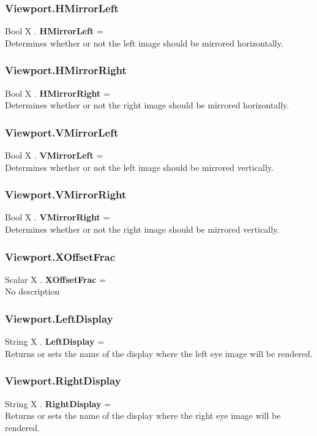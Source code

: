 \subsubsection{Viewport.HMirrorLeft \label{F:Viewport:HMirrorLeft}}
Bool X . \textbf{HMirrorLeft} = \\
Determines whether or not the left image should be mirrored horizontally.


\subsubsection{Viewport.HMirrorRight \label{F:Viewport:HMirrorRight}}
Bool X . \textbf{HMirrorRight} = \\
Determines whether or not the right image should be mirrored horizontally.

\subsubsection{Viewport.VMirrorLeft \label{F:Viewport:VMirrorLeft}}
Bool X . \textbf{VMirrorLeft} = \\
Determines whether or not the left image should be mirrored vertically.

\subsubsection{Viewport.VMirrorRight \label{F:Viewport:VMirrorRight}}
Bool X . \textbf{VMirrorRight} = \\
Determines whether or not the right image should be mirrored vertically.

\subsubsection{Viewport.XOffsetFrac \label{F:Viewport:XOffsetFrac}}
Scalar X . \textbf{XOffsetFrac} = \\
No description

\subsubsection{Viewport.LeftDisplay \label{F:Viewport:LeftDisplay}}
String X . \textbf{LeftDisplay} = \\
Returns or sets the name of the display where the left eye image will be rendered.

\subsubsection{Viewport.RightDisplay \label{F:Viewport:RightDisplay}}
String X . \textbf{RightDisplay} = \\
Returns or sets the name of the display where the right eye image will be rendered.


